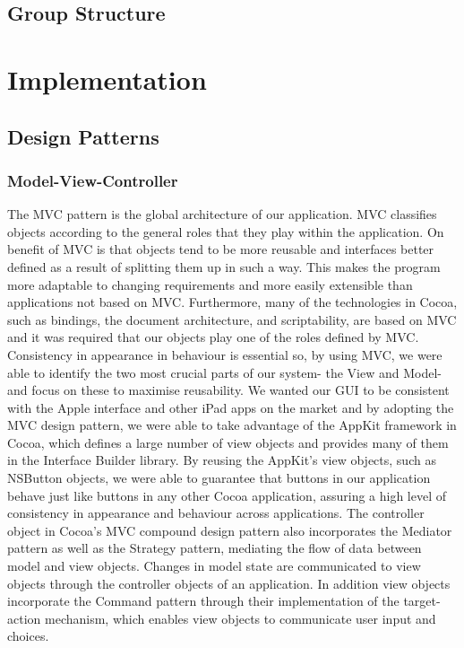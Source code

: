\documentclass[a4wide, 10pt]{article}
\begin{document}
\subsection{Group Structure}



\section{Implementation}

\subsection{Design Patterns}

\subsubsection{Model-View-Controller}

The MVC pattern is the global architecture of our application. MVC classifies objects according to the general roles that they play within the application. On benefit of MVC is that objects tend to be more reusable and interfaces better defined as a result of splitting them up in such a way. This makes the program more adaptable to changing requirements and more easily extensible than applications not based on MVC. Furthermore, many of the technologies in Cocoa, such as bindings, the document architecture, and scriptability, are based on MVC and it was required that our objects play one of the roles defined by MVC. Consistency in appearance in behaviour is essential so, by using MVC, we were able to identify the two most crucial parts of our system- the View and Model- and focus on these to maximise reusability.  We wanted our GUI to be consistent with the Apple interface and other iPad apps on the market and by adopting the MVC design pattern, we were able to take advantage of the AppKit framework in Cocoa, which defines a large number of view objects and provides many of them in the Interface Builder library. By reusing the AppKit's view objects, such as NSButton objects, we were able to guarantee that buttons in our application behave just like buttons in any other Cocoa application, assuring a high level of consistency in appearance and behaviour across applications. The controller object in Cocoa's MVC compound design pattern also incorporates the Mediator pattern as well as the Strategy pattern, mediating the flow of data between model and view objects. Changes in model state are communicated to view objects through the controller objects of an application. In addition view objects incorporate the Command pattern through their implementation of the target-action mechanism, which enables view objects to communicate user input and choices.
\end{document}
